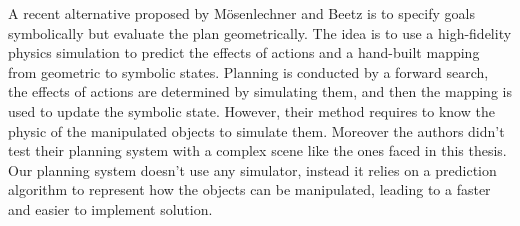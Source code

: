 

A recent alternative proposed by Mösenlechner and Beetz \citep{Msenlechner2009UsingPA} is to specify goals symbolically but evaluate the plan geometrically.
The idea is to use a high-fidelity physics simulation to predict the effects of actions and a hand-built mapping from geometric to symbolic states. Planning is conducted by a forward search, the effects of actions are determined by simulating them, and then the mapping is used to update the symbolic state. However, their method requires to know the physic of the manipulated objects to simulate them. Moreover the authors didn't test their planning system with a complex scene like the ones faced in this thesis.
Our planning system doesn't use any simulator, instead it relies on a prediction algorithm to represent how the objects can be manipulated, leading to a faster and easier to implement solution. 




